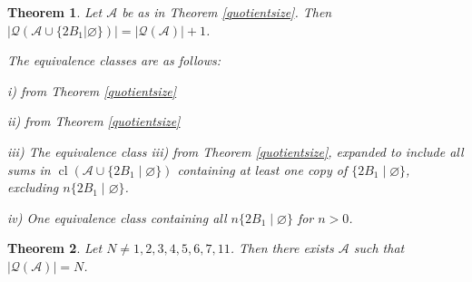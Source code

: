 \documentclass[10pt,a4paper]{amsart}
\newtheorem{thm}{Theorem}
\DeclareMathOperator{\cl}{cl}
\begin{document}
\begin{thm}
\label{quotientsize2}
    Let $\mathscr{A}$ be as in Theorem \ref{quotientsize}. Then $\left|\mathcal{Q} ( \mathscr{A} \cup \{2B_1 | \varnothing\})\right|  = \left |\mathcal{Q} (\mathscr{A})\right |+1$.

    The equivalence classes are as follows: 

    i) from Theorem \ref{quotientsize}

    ii) from Theorem \ref{quotientsize}

    iii) The equivalence class iii) from Theorem \ref{quotientsize}, expanded to include all sums in $\cl(\mathscr{A} \cup \{2B_1 \mid \varnothing\})$ containing at least one copy of $\{2B_1 \mid \varnothing\}$, excluding $n\{2B_1 \mid \varnothing\}$.

    iv) One equivalence class containing all $n\{2B_1 \mid \varnothing\}$ for $n>0$.
\end{thm}

\begin{thm}
    Let $N\neq  1,2,3,4,5,6,7,11$. Then there exists $\mathscr{A}$ such that $|\mathcal{Q}(\mathscr{A})| = N$.
\end{thm}
\end{document}
